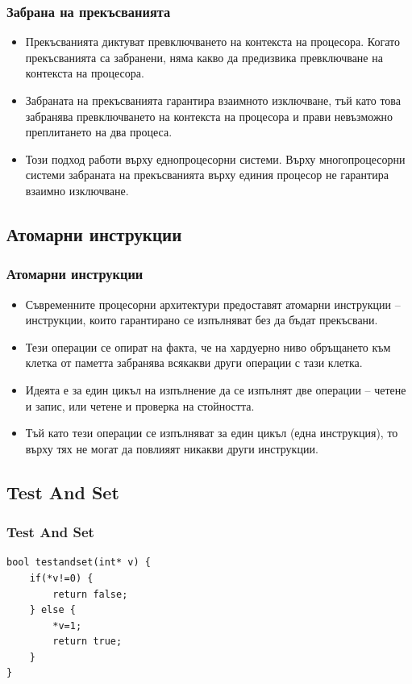 \documentclass[ignorenonframetext, hyperref=unicode]{beamer}
\begin{document}
\begin{frame}[containsverbatim]
\frametitle{Забрана на прекъсванията}
\begin{itemize}
\item Прекъсванията диктуват превключването на контекста на процесора. Когато
прекъсванията са забранени, няма какво да предизвика превключване на контекста
на процесора. 
\item Забраната на прекъсванията гарантира взаимното изключване, тъй като това
забранява превключването на контекста на процесора и прави невъзможно
преплитането на два процеса.
\item Този подход работи върху еднопроцесорни системи. Върху многопроцесорни
системи забраната на прекъсванията върху единия процесор не гарантира взаимно
изключване. 
\end{itemize}
\end{frame}

\subsection{Атомарни инструкции}

\begin{frame}[containsverbatim]
\frametitle{Атомарни инструкции}
\begin{itemize}
\item  Съвременните процесорни архитектури предоставят атомарни инструкции --
инструкции, които гарантирано се изпълняват без да бъдат прекъсвани.
\item Тези операции се опират на факта, че на хардуерно ниво обръщането към
клетка от паметта забранява всякакви други операции с тази клетка.
\item Идеята е за един цикъл на изпълнение да се изпълнят две
операции -- четене и запис, или четене и проверка на стойността.
\item Тъй като тези операции се изпълняват за един цикъл (една инструкция), то
върху тях не могат да повлияят никакви други инструкции.
\end{itemize}
\end{frame}

\subsection{Test And Set}
\begin{frame}[containsverbatim]
\frametitle{Test And Set}

\begin{lstlisting}
bool testandset(int* v) {
	if(*v!=0) {
		return false;
	} else {
		*v=1;
		return true;
	}
}
\end{lstlisting}
\end{frame}
\end{document}
